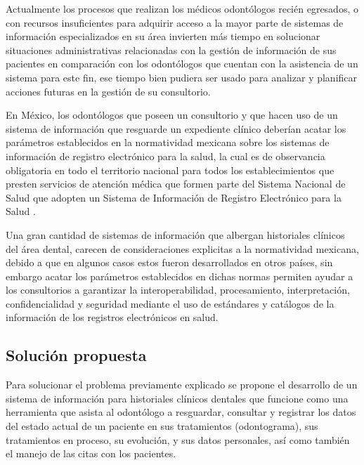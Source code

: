 Actualmente los procesos que realizan los médicos odontólogos recién egresados, o con recursos insuficientes para adquirir acceso a la mayor parte de sistemas de información especializados en su área invierten más tiempo en solucionar situaciones administrativas relacionadas con la gestión de información de sus pacientes en comparación con los odontólogos que cuentan con la asistencia de un sistema para este fin, ese tiempo bien pudiera ser usado para analizar y planificar acciones futuras en la gestión de su consultorio. 

\vspace{1em}

En México, los odontólogos que poseen un consultorio y que hacen uso de un sistema de información que resguarde un expediente clínico deberían acatar los parámetros establecidos en la normatividad mexicana sobre los sistemas de información de registro electrónico para la salud, la cual es de observancia obligatoria en todo el territorio nacional para todos los establecimientos que presten servicios de atención médica que formen parte del Sistema Nacional de Salud que adopten un Sistema de Información de Registro Electrónico para la Salud \cite{A02}. 

\vspace{1em}

Una gran cantidad de sistemas de información que albergan historiales clínicos del área dental, carecen de consideraciones explicitas a la normatividad mexicana, debido a que en algunos casos estos fueron desarrollados en otros países, sin embargo acatar los parámetros establecidos en dichas normas permiten ayudar a los consultorios a garantizar la interoperabilidad, procesamiento, interpretación, confidencialidad y seguridad mediante el uso de estándares y catálogos de la información de los registros electrónicos en salud.

\subsection{Solución propuesta}

Para solucionar el problema previamente explicado se propone el desarrollo de un sistema de información para historiales clínicos dentales que funcione como una herramienta que asista al odontólogo a resguardar, consultar y registrar los datos del estado actual de un paciente en sus tratamientos (odontograma), sus tratamientos en proceso, su evolución, y sus datos personales, así como también el manejo de las citas con los pacientes.

